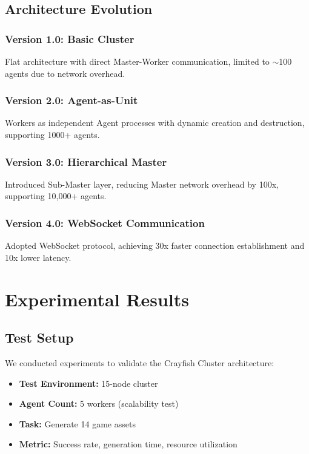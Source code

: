 \documentclass[11pt,a4paper]{article}
\begin{document}
\subsection{Architecture Evolution}
\subsubsection{Version 1.0: Basic Cluster}
Flat architecture with direct Master-Worker communication, limited to $\sim$100 agents due to network overhead.

\subsubsection{Version 2.0: Agent-as-Unit}
Workers as independent Agent processes with dynamic creation and destruction, supporting 1000+ agents.

\subsubsection{Version 3.0: Hierarchical Master}
Introduced Sub-Master layer, reducing Master network overhead by 100x, supporting 10,000+ agents.

\subsubsection{Version 4.0: WebSocket Communication}
Adopted WebSocket protocol, achieving 30x faster connection establishment and 10x lower latency.

\section{Experimental Results}
\subsection{Test Setup}
We conducted experiments to validate the Crayfish Cluster architecture:
\begin{itemize}
    \item \textbf{Test Environment:} 15-node cluster
    \item \textbf{Agent Count:} 5 workers (scalability test)
    \item \textbf{Task:} Generate 14 game assets
    \item \textbf{Metric:} Success rate, generation time, resource utilization
\end{itemize}
\end{document}
